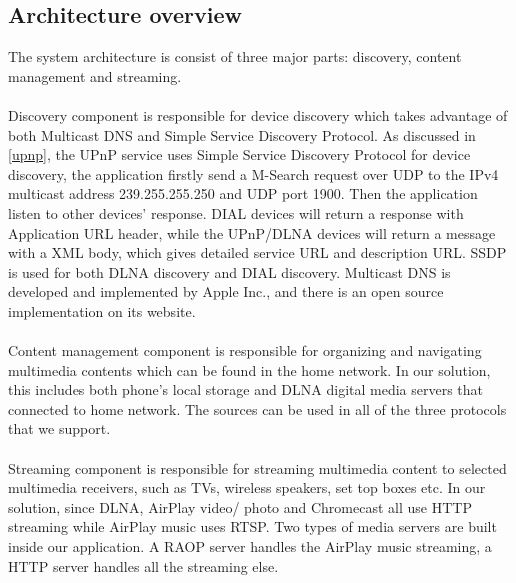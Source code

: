 \subsection{Architecture overview}
The system architecture is consist of three major parts: discovery, content
management and streaming.\\
\\
Discovery component is responsible for device discovery which takes advantage of
both Multicast DNS and Simple Service Discovery Protocol. As discussed in
\ref{upnp}, the UPnP service uses Simple Service Discovery Protocol for device
discovery, the application firstly send a M-Search request over UDP to the
IPv4 multicast address 239.255.255.250 and UDP port 1900. Then the application
listen to other devices' response. DIAL devices will return a response with
Application URL header, while the UPnP/DLNA devices will return a message with
a XML body, which gives detailed service URL and description URL. SSDP is used
for both DLNA discovery and DIAL discovery. Multicast DNS is developed and
implemented by Apple Inc., and there is an open source implementation on its
website.\\
\\
Content management component is responsible for organizing and
navigating multimedia contents which can be found in the home network. In our
solution, this includes both phone's local storage and DLNA digital media
servers that connected to home network. The sources can be used in all of the
three protocols that we support.\\
\\
Streaming component is responsible for streaming multimedia content to selected
multimedia receivers, such as TVs, wireless speakers, set top boxes etc. In our
solution, since DLNA, AirPlay video/ photo and Chromecast all use HTTP streaming
while AirPlay music uses RTSP. Two types of media servers are built inside our
application. A RAOP server handles the AirPlay music streaming, a HTTP server
handles all the streaming else.


